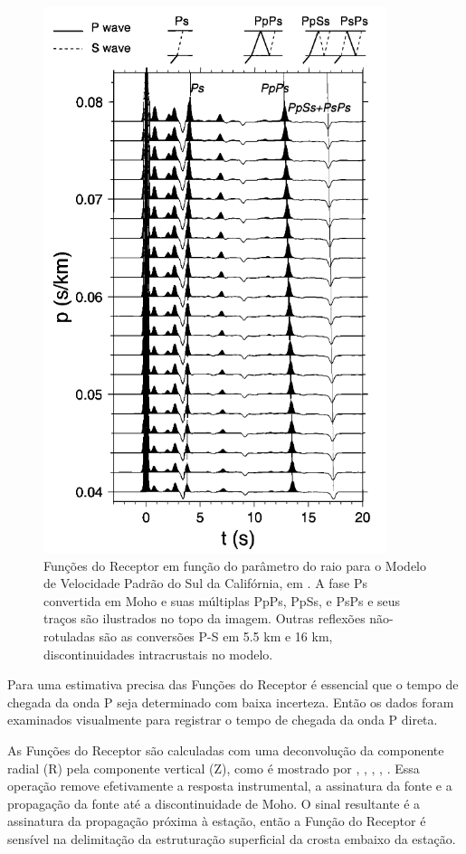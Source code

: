 \begin{figure}[!ht]
\centering
\includegraphics[scale=0.8]{Figs/funcoes_sinteticas.png}
\caption[Funções do Receptor em função do parâmetro do raio para o Modelo de Velocidade Padrão do Sul da Califórnia.]{Funções do Receptor em função do parâmetro do raio para o Modelo de Velocidade Padrão do Sul da Califórnia, em \cite{Zhu_Kanamori_2000}. A fase Ps convertida em Moho e suas múltiplas  PpPs, PpSs, e PsPs e seus traços são ilustrados no topo da imagem. Outras reflexões não-rotuladas são as conversões P-S em 5.5 km e 16 km, discontinuidades intracrustais no modelo.}
\label{funcoes_sinteticas}
\end{figure}

Para uma estimativa precisa das Funções do Receptor é essencial que o tempo de chegada da onda P seja determinado com baixa incerteza. Então os dados foram examinados visualmente para registrar o tempo de chegada da onda P direta. 

As Funções do Receptor são calculadas com uma deconvolução da componente radial (R) pela componente vertical (Z), como é mostrado por \cite{clayton_source_1976}, \cite{Langston_1977}, \cite{ammon_isolation_1991}, \cite{cassidy_numerical_1992}, \cite{Zhu_Kanamori_2000}. Essa operação remove efetivamente a resposta instrumental, a assinatura da fonte e a propagação da fonte até a discontinuidade de Moho. O sinal resultante é a assinatura da propagação próxima à estação, então a Função do Receptor é sensível na delimitação da estruturação superficial da crosta embaixo da estação.

